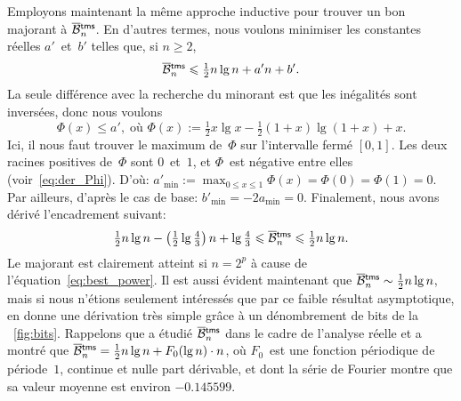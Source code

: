 Employons maintenant la même approche inductive pour trouver un bon
majorant à \(\OB{\fun{tms}}{n}\). En d'autres termes, nous voulons
minimiser les constantes réelles \(a'\)~et~\(b'\) telles que, si \(n
\geqslant 2\),
\begin{equation*}
\OB{\fun{tms}}{n} \leqslant \tfrac{1}{2}n\lg n + a'n + b'.
\end{equation*}
La seule différence avec la recherche du minorant est que les
inégalités sont inversées, donc nous voulons
\begin{equation*}
\Phi(x) \leqslant a', \;\text{où \(\Phi(x) := \tfrac{1}{2}x\lg x - \tfrac{1}{2}(1+x)\lg(1+x) + x\)}.
\end{equation*}
Ici, il nous faut trouver le maximum de~\(\Phi\) sur l'intervalle
fermé \([0,1]\). Les deux racines positives de~\(\Phi\) sont
\(0\)~et~\(1\), et \(\Phi\)~est négative entre elles
(voir~\eqref{eq:der_Phi}). D'où: \(a'_{\min} := \max_{0 \leqslant x
  \leqslant 1}\Phi(x) = \Phi(0) = \Phi(1) = 0\). Par ailleurs, d'après
le cas de base: \(b'_{\min} = -2a_{\min} = 0\). Finalement, nous
avons dérivé l'encadrement suivant:
\begin{equation}
\tfrac{1}{2}n\lg n - \left(\tfrac{1}{2}\lg\tfrac{4}{3}\right)n + \lg\tfrac{4}{3}
\leqslant \OB{\fun{tms}}{n} \leqslant
\tfrac{1}{2}n\lg n.
\label{ineq:bounds_Btms}
\index{tms@$\OB{\fun{tms}}{n}$}
\end{equation}
Le majorant est clairement atteint si \(n=2^p\) à cause de
l'équation~\eqref{eq:best_power}. Il est aussi évident maintenant que
\(\OB{\fun{tms}}{n} \sim \frac{1}{2}n\lg n\), mais si nous n'étions
seulement intéressés que par ce faible résultat asymptotique,
\cite{Bush_1940} en donne une dérivation très simple grâce à un
dénombrement de bits de la \fig~\vref{fig:bits}. Rappelons que
\cite{Delange_1975} a étudié \(\OB{\fun{tms}}{n}\) dans le cadre de
l'analyse réelle et a montré que \(\OB{\fun{tms}}{n} =
\tfrac{1}{2}n\lg n + F_0(\lg n) \cdot n\), où \(F_0\)~est une fonction
périodique de période~\(1\), continue et nulle part dérivable, et dont
la série de Fourier montre que sa valeur moyenne est environ \(-0.145599\).


